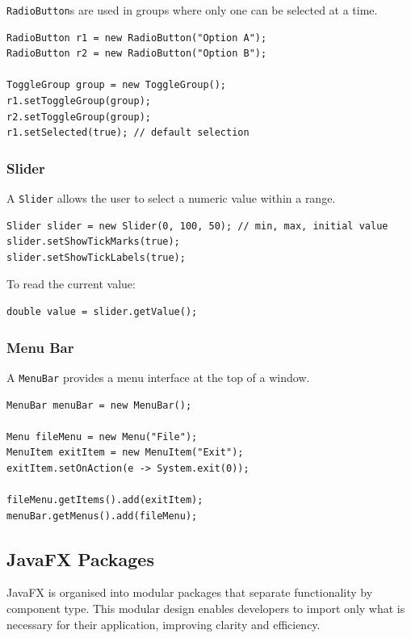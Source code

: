 \documentclass{article}
\newcommand{\codecmd}[1]{\textcolor[rgb]{0,0.5,0}{\texttt{#1}}}
\begin{document}
\codecmd{RadioButton}s are used in groups where only one can be selected at a time.

\begin{verbatim}
RadioButton r1 = new RadioButton("Option A");
RadioButton r2 = new RadioButton("Option B");

ToggleGroup group = new ToggleGroup();
r1.setToggleGroup(group);
r2.setToggleGroup(group);
r1.setSelected(true); // default selection
\end{verbatim}

\subsubsection{Slider}

A \codecmd{Slider} allows the user to select a numeric value within a range.

\begin{verbatim}
Slider slider = new Slider(0, 100, 50); // min, max, initial value
slider.setShowTickMarks(true);
slider.setShowTickLabels(true);
\end{verbatim}

To read the current value:
\begin{verbatim}
double value = slider.getValue();
\end{verbatim}

\subsubsection{Menu Bar}

A \codecmd{MenuBar} provides a menu interface at the top of a window.

\begin{verbatim}
MenuBar menuBar = new MenuBar();

Menu fileMenu = new Menu("File");
MenuItem exitItem = new MenuItem("Exit");
exitItem.setOnAction(e -> System.exit(0));

fileMenu.getItems().add(exitItem);
menuBar.getMenus().add(fileMenu);
\end{verbatim}


\subsection{JavaFX Packages}

JavaFX is organised into modular packages that separate functionality by component type. This modular design enables developers to import only what is necessary for their application, improving clarity and efficiency.
\end{document}
